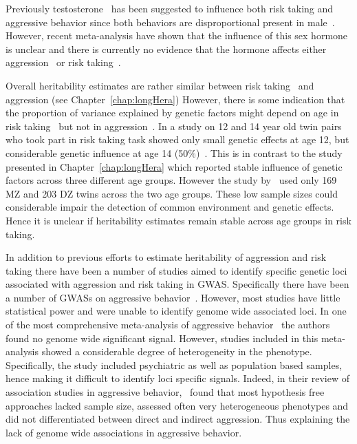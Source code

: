 Previously testosterone~\cite{Vermeersch2008} has been suggested to influence both risk taking and aggressive behavior since both behaviors are disproportional present in male~\cite{Byrnes1999}.
However, recent meta-analysis have shown that  the influence of this sex hormone is unclear and there is currently no evidence that the hormone affects either aggression~\cite{Archer2005a} or risk taking~\cite{Vermeersch2008}.

Overall heritability estimates are rather similar between risk taking~\cite{Anokhin2009} and aggression (see Chapter~\ref{chap:longHera})
However, there is some indication that the proportion of variance explained by genetic factors might depend on age in risk taking~\cite{Anokhin2009} but not in aggression~\cite{Porsch2016}.
In a study on 12 and 14 year old twin pairs who took part in risk taking task showed only small genetic effects at age 12, but considerable genetic influence at age 14 (50\%)~\cite{Anokhin2009}.
This is in contrast to the study presented in Chapter~\ref{chap:longHera} which reported stable influence of genetic factors across three different age groups.
However the study by~\citet{Anokhin2009} used only 169 MZ and 203 DZ twins across the two age groups.
These low sample sizes could considerable impair the detection of common environment and genetic effects. 
Hence it is unclear if heritability estimates remain stable across age groups in risk taking.

In addition to previous efforts to estimate heritability of aggression and risk taking there have been a number of studies aimed to identify specific genetic loci associated with aggression and risk taking in GWAS\@.
Specifically there have been a number of GWASs on aggressive behavior~\cite{Fernandez-Castillo2016}.
However, most studies have little statistical power and were unable to identify genome wide associated loci.
In one of the most comprehensive meta-analysis of aggressive behavior~\citet{Vassos2014} the authors found no genome wide significant signal.
However, studies included in this meta-analysis showed a considerable degree of heterogeneity in the phenotype.
Specifically, the study included psychiatric as well as population based samples, hence making it difficult to identify loci specific signals.
Indeed, in their review of association studies in aggressive behavior,~\citet{Fernandez-Castillo2016} found that most hypothesis free approaches lacked sample size, assessed often very heterogeneous phenotypes and did not differentiated between direct and indirect aggression. 
Thus explaining the lack of genome wide associations in aggressive behavior.

